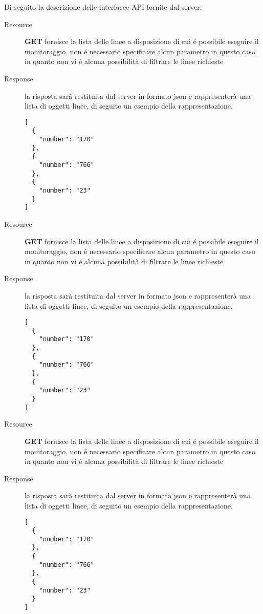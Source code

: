 Di seguito la descrizione delle interfacce API fornite dal server:

\begin{description}
	\item[Resource] \textbf{GET \lines} fornisce la lista delle linee a disposizione di cui é possibile eseguire il monitoraggio, non é necessario specificare alcun parametro in questo caso in quanto non vi é alcuna possibilità di filtrare le linee richieste
	\item[Response] la risposta sarà restituita dal server in formato json e rappresenterà una lista di oggetti linee, di seguito un esempio della rappresentazione.

	\begin{verbatim}
[
  {
    "number": "170"
  },
  {
    "number": "766"
  },
  {
    "number": "23"
  }
]
	\end{verbatim}
\end{description}

\begin{description}
	\item[Resource] \textbf{GET \lines} fornisce la lista delle linee a disposizione di cui é possibile eseguire il monitoraggio, non é necessario specificare alcun parametro in questo caso in quanto non vi é alcuna possibilità di filtrare le linee richieste
	\item[Response] la risposta sarà restituita dal server in formato json e rappresenterà una lista di oggetti linee, di seguito un esempio della rappresentazione.

	\begin{verbatim}
[
  {
    "number": "170"
  },
  {
    "number": "766"
  },
  {
    "number": "23"
  }
]
	\end{verbatim}
\end{description}

\begin{description}
	\item[Resource] \textbf{GET \lines} fornisce la lista delle linee a disposizione di cui é possibile eseguire il monitoraggio, non é necessario specificare alcun parametro in questo caso in quanto non vi é alcuna possibilità di filtrare le linee richieste
	\item[Response] la risposta sarà restituita dal server in formato json e rappresenterà una lista di oggetti linee, di seguito un esempio della rappresentazione.

	\begin{verbatim}
[
  {
    "number": "170"
  },
  {
    "number": "766"
  },
  {
    "number": "23"
  }
]
	\end{verbatim}
\end{description}

